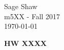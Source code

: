 \documentclass[12pt]{article}
\begin{document}
	\thispagestyle{empty}
	
	\begin{flushright}
		Sage Shaw \\
		m5XX - Fall 2017 \\
		\today
	\end{flushright}
	
{\large \textbf{HW XXXX}}\bigbreak
\end{document}
